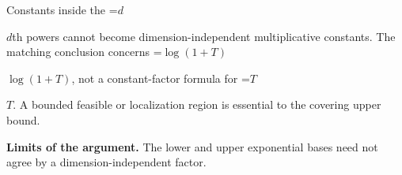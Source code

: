\documentclass[10pt,a4paper]{article}
\newcommand{\AtlasMath}[1]{\par\begingroup\centering\setbox0=\hbox{$\displaystyle #1$}\ifdim\wd0>1.4\linewidth\typeout{ATLAS WIDE FORMULA: \the\wd0}\fi\ifdim\wd0>\linewidth\resizebox{\linewidth}{!}{\box0}\else\box0\fi\par\endgroup}
\newcommand{\AtlasInlineMath}[1]{\begingroup\setbox0=\hbox{$#1$}\ifdim\wd0>.4\linewidth\endgroup\AtlasMath{#1}\else\endgroup$#1$\fi}
\begin{document}
Constants inside the \AtlasInlineMath{d}th powers cannot become dimension-independent multiplicative constants. The matching conclusion concerns \AtlasInlineMath{\log(1+T)}, not a constant-factor formula for \AtlasInlineMath{T}. A bounded feasible or localization region is essential to the covering upper bound.

\textbf{Limits of the argument.} The lower and upper exponential bases need not agree by a dimension-independent factor.
\end{document}
